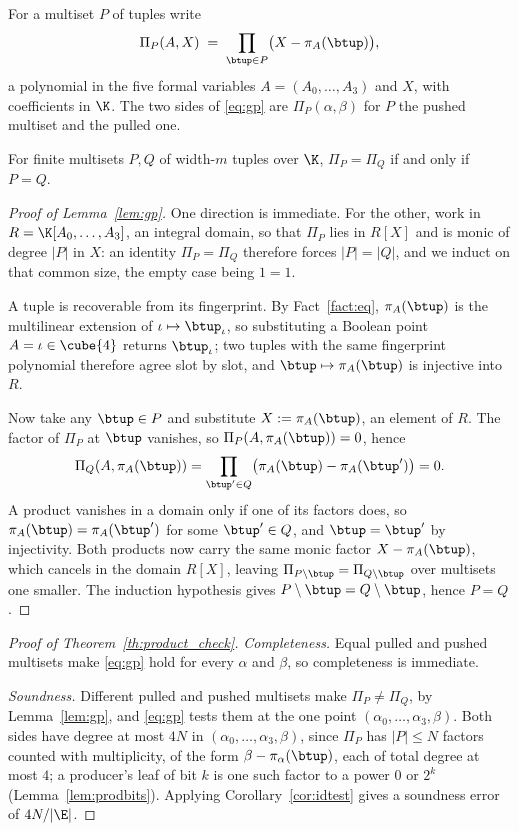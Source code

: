 \begin{lemma}\label{lem:gp}
For a multiset $P$ of tuples write
\[
  \Pi_P(A,X)\;=\;\prod_{\btup\in P}\bigl(X-\pi_A(\btup)\bigr),
\]
a polynomial in the five formal variables $A=(A_0,\dots,A_3)$ and $X$, with coefficients in $\K$. The two sides of \eqref{eq:gp} are $\Pi_P(\alpha,\beta)$ for $P$ the pushed multiset and the pulled one.

For finite multisets $P,Q$ of width-$m$ tuples over $\K$, $\Pi_P=\Pi_Q$ if and only if $P=Q$.
\end{lemma}

\begin{proof}[Proof of Lemma~\ref{lem:gp}]
One direction is immediate. For the other, work in $R=\K[A_0,\dots,A_3]$, an integral domain, so that $\Pi_P$ lies in $R[X]$ and is monic of degree $|P|$ in $X$: an identity $\Pi_P=\Pi_Q$ therefore forces $|P|=|Q|$, and we induct on that common size, the empty case being $1=1$.

A tuple is recoverable from its fingerprint. By Fact~\ref{fact:eq}, $\pi_A(\btup)$ is the multilinear extension of $\iota\mapsto\btup_\iota$, so substituting a Boolean point $A=\iota\in\cube{4}$ returns $\btup_\iota$; two tuples with the same fingerprint polynomial therefore agree slot by slot, and $\btup\mapsto\pi_A(\btup)$ is injective into $R$.

Now take any $\btup\in P$ and substitute $X:=\pi_A(\btup)$, an element of $R$. The factor of $\Pi_P$ at $\btup$ vanishes, so $\Pi_P(A,\pi_A(\btup))=0$, hence
\[
  \Pi_Q(A,\pi_A(\btup))=\prod_{\btup'\in Q}\bigl(\pi_A(\btup)-\pi_A(\btup')\bigr)=0 .
\]
A product vanishes in a domain only if one of its factors does, so $\pi_A(\btup)=\pi_A(\btup')$ for some $\btup'\in Q$, and $\btup=\btup'$ by injectivity. Both products now carry the same monic factor $X-\pi_A(\btup)$, which cancels in the domain $R[X]$, leaving $\Pi_{P\setminus\btup}=\Pi_{Q\setminus\btup}$ over multisets one smaller. The induction hypothesis gives $P\setminus\btup=Q\setminus\btup$, hence $P=Q$.
\end{proof}


\begin{proof}[Proof of Theorem~\ref{th:product_check}]
\emph{Completeness.} Equal pulled and pushed multisets make \eqref{eq:gp} hold for every $\alpha$ and $\beta$, so completeness is immediate.

\emph{Soundness.} Different pulled and pushed multisets make $\Pi_P\neq\Pi_Q$, by Lemma~\ref{lem:gp}, and \eqref{eq:gp} tests them at the one point $(\alpha_0, \dots, \alpha_3, \beta)$. Both sides have degree at most $4N$ in $(\alpha_0, \dots, \alpha_3, \beta)$, since $\Pi_P$ has $|P|\le N$ factors counted with multiplicity, of the form $\beta-\pi_\alpha(\btup)$, each of total degree at most $4$; a producer's leaf of bit $k$ is one such factor to a power $0$ or $2^{k}$ (Lemma~\ref{lem:prodbits}). Applying Corollary~\ref{cor:idtest} gives a soundness error of $4N/|\E|$.
\end{proof}

